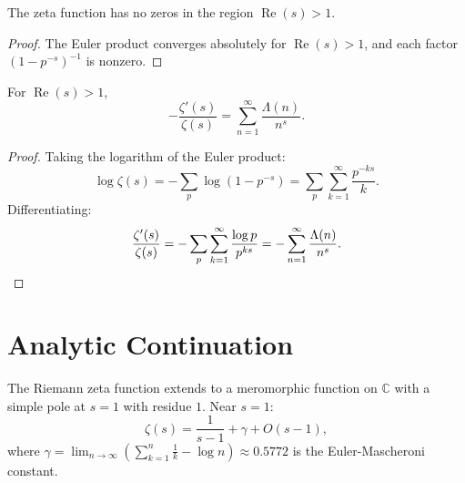 \begin{corollary}
  The zeta function has no zeros in the region $\operatorname{Re}(s) > 1$.
\end{corollary}

\begin{proof}
  The Euler product converges absolutely for $\operatorname{Re}(s) > 1$, and each factor $(1 - p^{-s})^{-1}$ is nonzero.
\end{proof}

\begin{theorem}
  For $\operatorname{Re}(s) > 1$,
  \begin{equation}
    -\frac{\zeta'(s)}{\zeta(s)} = \sum_{n=1}^{\infty} \frac{\Lambda(n)}{n^s}.
  \end{equation}
\end{theorem}

\begin{proof}
  Taking the logarithm of the Euler product:
  \begin{equation}
    \log \zeta(s) = -\sum_p \log(1 - p^{-s}) = \sum_p \sum_{k=1}^{\infty} \frac{p^{-ks}}{k}.
  \end{equation}
  Differentiating:
  \begin{equation}
    \frac{\zeta'(s)}{\zeta(s)} = -\sum_p \sum_{k=1}^{\infty} \frac{\log p}{p^{ks}} = -\sum_{n=1}^{\infty} \frac{\Lambda(n)}{n^s}. \qedhere
  \end{equation}
\end{proof}

\section{Analytic Continuation}

\begin{theorem}
  The Riemann zeta function extends to a meromorphic function on $\mathbb{C}$ with a simple pole at $s = 1$ with residue $1$. Near $s = 1$:
  \begin{equation}
    \zeta(s) = \frac{1}{s-1} + \gamma + O(s-1),
  \end{equation}
  where $\gamma = \lim_{n \to \infty}\left(\sum_{k=1}^{n} \frac{1}{k} - \log n\right) \approx 0.5772$ is the Euler-Mascheroni constant.
\end{theorem}

